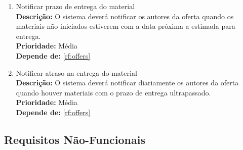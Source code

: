 \begin{enumerate}[label=\textbf{RF\protect\twodigits{\theenumi}}, leftmargin=2cm]
	\item \label{rf:deliveryNotification} Notificar prazo de entrega do material \\ 
		\textbf{Descrição:} O sistema deverá notificar os autores da oferta quando os materiais não iniciados estiverem com a data próxima a estimada para entrega. \\
		\textbf{Prioridade:} Média \\
		\textbf{Depende de:} \hyperref[rf:offers]{\ref{rf:offers}}

	\item \label{rf:deliveryDelayNotification} Notificar atraso na entrega do material \\ 
		\textbf{Descrição:} O sistema deverá notificar diariamente os autores da oferta quando houver materiais com o prazo de entrega ultrapassado.  \\
		\textbf{Prioridade:} Média \\
		\textbf{Depende de:} \hyperref[rf:offers]{\ref{rf:offers}}

	
\end{enumerate}

\subsection{Requisitos Não-Funcionais}

